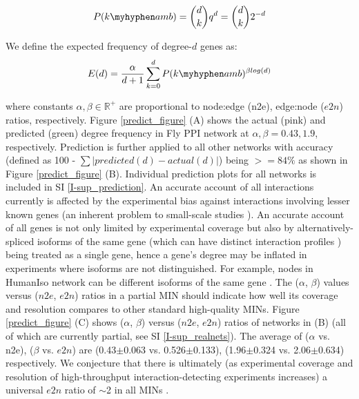             \begin{equation*}
						P(k\myhyphen amb) = {d \choose k}q^d = {d \choose k}2^{-d}
			\end{equation*}

			\noindent We define the expected frequency of degree-$d$ genes as:
            \begin{equation*}
						E(d)= \frac {\alpha}{d+1}\sum\limits_{k=0}^{d} P(k\myhyphen amb)^{\beta log(d)}
			\end{equation*}

            \noindent where constants $\alpha, \beta \in \mathbb{R^+}$ are proportional to node:edge (n2e), edge:node ($e2n$) ratios, respectively. Figure \ref{predict_figure} (A) shows the actual (pink) and predicted (green)  degree frequency in Fly PPI network   at $\alpha, \beta = 0.43, 1.9$, respectively. Prediction is further applied  to all other networks with   accuracy (defined as 100 - $\sum |predicted(d)-actual(d)|$) being $>=84\%$ as shown in Figure \ref{predict_figure} (B). Individual prediction plots for all networks is included in SI \ref{I-sup_prediction}.  An accurate account of all interactions currently is affected by the experimental bias against interactions involving lesser known genes (an inherent problem to small-scale studies \cite{rolland_proteome-scale_2014}). An accurate account of all genes is not only limited by experimental coverage but also  by alternatively-spliced isoforms of the same gene (which can have distinct interaction profiles \cite{yang_widespread_2016}) being treated as a single gene, hence a gene's degree may be inflated in experiments where isoforms are not distinguished. For example, nodes in HumanIso network can be different isoforms of the same gene \cite{yang_widespread_2016}.
            The  ($\alpha$, $\beta$) values versus ($n2e$, $e2n$) ratios in a partial MIN should indicate how well its coverage and resolution compares to other standard high-quality MINs. Figure \ref{predict_figure} (C) shows ($\alpha$, $\beta$) versus  ($n2e$, $e2n$) ratios of networks in (B) (all of which are currently partial, see SI \ref{I-sup_realnets}). The average  of ($\alpha$ vs. n2e), ($\beta$ vs. $e2n$) are (0.43$\pm$0.063 vs. 0.526$\pm$0.133), (1.96$\pm$0.324 vs. 2.06$\pm$0.634) respectively. We conjecture that there is ultimately (as experimental coverage and resolution of high-throughput interaction-detecting experiments increases) a universal $e2n$ ratio of ${\sim}$2 in all MINs .
